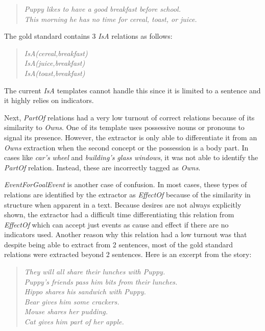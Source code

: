 \begin{verse}
\itshape
Puppy likes to have a good breakfast before school. \\
This morning he has no time for cereal, toast, or juice.\\
\end{verse}

The gold standard contains 3 \textit{IsA} relations as follows:

\begin{verse}
\itshape
IsA(cereal,breakfast)\\
IsA(juice,breakfast)\\
IsA(toast,breakfast)\\
\end{verse}

The current \textit{IsA} templates cannot handle this since it is limited to a sentence and it highly relies on indicators.

Next, \textit{PartOf} relations had a very low turnout of correct relations because of its similarity to \textit{Owns}. One of its template uses possessive nouns or pronouns to signal its presence. However, the extractor is only able to differentiate it from an \textit{Owns} extraction when the second concept or the possession is a body part. In cases like \textit{car's wheel} and \textit{building's glass windows}, it was not able to identify the \textit{PartOf} relation. Instead, these are incorrectly tagged as \textit{Owns}.

\textit{EventForGoalEvent} is another case of confusion. In most cases, these types of relations are identified by the extractor as \textit{EffectOf} because of the similarity in structure when apparent in a text. Because desires are not always explicitly shown, the extractor had a difficult time differentiating this relation from \textit{EffectOf} which can accept just events as cause and effect if there are no indicators used. Another reason why this relation had a low turnout was that despite being able to extract from 2 sentences, most of the gold standard relations were extracted beyond 2 sentences. Here is an excerpt from the story:

\begin{verse}
\itshape
They will all share their lunches with Puppy.\\
Puppy's friends pass him bits from their lunches. \\
Hippo shares his sandwich with Puppy. \\
Bear gives him some crackers. \\
Mouse shares her pudding. \\
Cat gives him part of her apple.\\
\end{verse}

